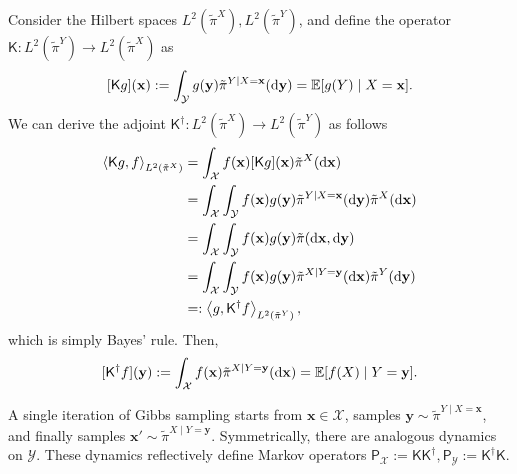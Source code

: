 \documentclass[11pt]{article}
\newcommand{\defeq}{:=}
\newcommand{\inprod}[2]{\left\langle#1, #2\right\rangle}
\newcommand{\dd}{\textup{d}}
\newcommand{\0}{\mathbf{0}}
\newcommand{\1}{\mathbf{1}}
\newcommand{\vx}{\mathbf{x}}
\newcommand{\vy}{\mathbf{y}}
\newcommand{\calX}{\mathcal{X}}
\newcommand{\calY}{\mathcal{Y}}
\newcommand{\sfK}{\mathsf{K}}
\newcommand{\sfP}{\mathsf{P}}
\newcommand{\tpi}{\tilde{\pi}}
\begin{document}
Consider the Hilbert spaces $L^2(\tpi^X), L^2(\tpi^Y)$, and define the operator $\sfK:L^2(\tpi^Y)\to L^2(\tpi^X)$ as
\begin{equation}\label{eq:forward-operator}
    [\sfK g](\vx)\defeq \int_{\calY} g(\vy)\tpi^{Y\mid X=\vx}(\dd\vy)=\mathbb{E}[g(Y)\mid X=\vx].
\end{equation}
We can derive the adjoint $\sfK^\dagger:L^2(\tpi^X)\to L^2(\tpi^Y)$ as follows
\begin{align*}
    \inprod{\sfK g}{f}_{L^2(\tpi^X)}
    &=\int_{\calX} f(\vx)[\sfK g](\vx)\tpi^{X}(\dd\vx)\\
    &=\int_{\calX} \int_{\calY} f(\vx)g(\vy)\tpi^{Y\mid X=\vx}(\dd\vy)\tpi^X(\dd \vx)\\
    &=\int_{\calX} \int_{\calY} f(\vx)g(\vy) \tpi(\dd\vx, \dd\vy)\\
    &=\int_{\calX}\int_{\calY} f(\vx)g(\vy)\tpi^{X\mid Y=\vy}(\dd\vx)\tpi^Y(\dd \vy)\\
    &=: \inprod{g}{\sfK^\dagger f}_{L^2(\tpi^Y)},
\end{align*}
which is simply Bayes' rule.  Then,
\begin{equation}\label{eq:backward-operator}
    [\sfK^\dagger f](\vy)\defeq \int_{\calX}f(\vx)\tpi^{X\mid Y=\vy}(\dd\vx)=\mathbb{E}[f(X)\mid Y=\vy].
\end{equation}

A single iteration of Gibbs sampling starts from $\vx\in\calX$, samples $\vy\sim\tpi^{Y\mid X=\vx}$, and finally samples
$\vx'\sim\tpi^{X\mid Y=\vy}$. Symmetrically, there are analogous dynamics on $\calY$. These dynamics reflectively define Markov operators $\sfP_{\calX}\defeq \sfK\sfK^\dagger, \sfP_{\calY}\defeq \sfK^\dagger \sfK$.  
\end{document}
